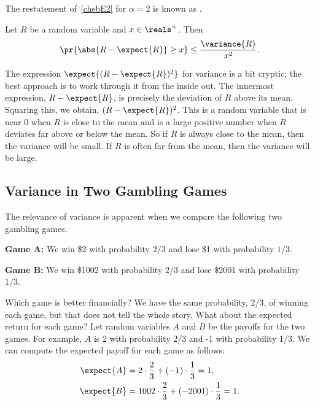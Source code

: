 The restatement of~\eqref{chebE2} for $\alpha=2$ is known as .
\begin{theorem}[Chebyshev]\label{chebthm}
  Let $R$ be a random variable and $x \in \reals^+$.  Then
\[
\pr{\abs{R - \expect{R}} \geq x} \leq \frac{\variance{R}}{x^2}.
\]
\end{theorem}

The expression $\expect{(R - \expect{R})^2}$ for variance is a bit
cryptic; the best approach is to work through it from the inside out.  The
innermost expression, $R - \expect{R}$, is precisely the deviation of $R$
above its mean.  Squaring this, we obtain, $(R - \expect{R})^2$.  This is
a random variable that is near 0 when $R$ is close to the mean and is a
large positive number when $R$ deviates far above or below the mean.  So
if $R$ is always close to the mean, then the variance will be small.  If
$R$ is often far from the mean, then the variance will be large.

\subsection{Variance in Two Gambling Games}

The relevance of variance is apparent when we compare the following
two gambling games.

\textbf{Game A:} We win \$2 with probability $2/3$ and lose \$1 with probability
$1/3$.

\textbf{Game B:} We win \$1002 with probability $2/3$ and lose \$2001 with
probability $1/3$.

Which game is better financially?  We have the same probability, 2/3,
of winning each game, but that does not tell the whole story.  What about
the expected return for each game?  Let random variables $A$ and $B$ be
the payoffs for the two games.  For example, $A$ is 2 with probability
2/3 and -1 with probability 1/3.  We can compute the
expected payoff for each game as follows:
\begin{align*}
\expect{A} &= 2 \cdot \frac{2}{3} + (-1) \cdot \frac{1}{3} = 1, \\
\expect{B} &= 1002 \cdot \frac{2}{3} + (-2001) \cdot \frac{1}{3} = 1.
\end{align*}


